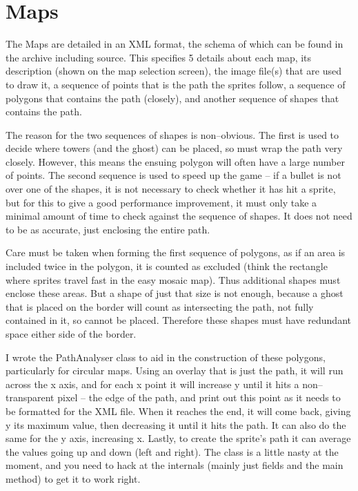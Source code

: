 \documentclass[a4paper,11pt]{article}
\begin{document}
\section{Maps}
The Maps are detailed in an XML format, the schema of which can be found in the archive including source. This specifies 5 details about each map, its description (shown on the map selection screen), the image file(s) that are used to draw it, a sequence of points that is the path the sprites follow, a sequence of polygons that contains the path (closely), and another sequence of shapes that contains the path.

The reason for the two sequences of shapes is non--obvious. The first is used to decide where towers (and the ghost) can be placed, so must wrap the path very closely. However, this means the ensuing polygon will often have a large number of points. The second sequence is used to speed up the game -- if a bullet is not over one of the shapes, it is not necessary to check whether it has hit a sprite, but for this to give a good performance improvement, it must only take a minimal amount of time to check against the sequence of shapes. It does not need to be as accurate, just enclosing the entire path.

Care must be taken when forming the first sequence of polygons, as if an area is included twice in the polygon, it is counted as excluded (think the rectangle where sprites travel fast in the easy mosaic map). Thus additional shapes must enclose these areas. But a shape of just that size is not enough, because a ghost that is placed on the border will count as intersecting the path, not fully contained in it, so cannot be placed. Therefore these shapes must have redundant space either side of the border.

I wrote the PathAnalyser class to aid in the construction of these polygons, particularly for circular maps. Using an overlay that is just the path, it will run across the x axis, and for each x point it will increase y until it hits a non--transparent pixel -- the edge of the path, and print out this point as it needs to be formatted for the XML file. When it reaches the end, it will come back, giving y its maximum value, then decreasing it until it hits the path. It can also do the same for the y axis, increasing x. Lastly, to create the sprite's path it can average the values going up and down (left and right). The class is a little nasty at the moment, and you need to hack at the internals (mainly just fields and the main method) to get it to work right.
\end{document}
